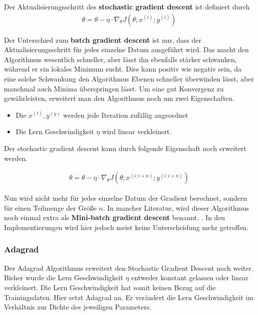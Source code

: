 \begin{definition}
    \cite[Kapitel 2.2]{Ruder.9152016}
    Der Aktualisierungsschritt des \textbf{stochastic gradient descent} ist definiert durch 
    \begin{align}
        \theta = \theta - \eta \cdot \nabla_\theta J(\theta;x^{(i)};y^{(i)})
    \end{align}
\end{definition}

Der Unterschied zum \textbf{batch gradient descent} ist nur, dass der Aktualisierungsschritt
für jedes einzelne Datum ausgeführt wird. Das macht den 
Algorithmus wesentlich schneller, aber lässt ihn ebenfalls 
stärker schwanken, während er ein lokales Minimum sucht. Dies kann
positiv wie negativ sein, da eine solche Schwankung 
den Algorithmus Ebenen schneller überwinden lässt, aber manchmal
auch Minima überspringen lässt. Um eine gut Konvergenz zu gewährleisten,
erweitert man den Algorithmus noch um zwei Eigenschaften.

\begin{itemize}
    \item Die $x^{(i)}, y^{(y)}$ werden jede Iteration zufällig angeordnet
    \item Die Lern Geschwindigkeit $\eta$ wird linear verkleinert. 
\end{itemize}

Der stochastic gradient descent kann durch folgende Eigenschaft noch 
erweitert werden.

\begin{align}
    \theta = \theta - \eta \cdot \nabla_\theta J(\theta;x^{(i:i+n)};y^{(i:i+n)})
\end{align}

Nun wird nicht mehr für jedes einzelne Datum der Gradient berechnet, sondern
für einen Teilmenge der Größe $n$. In mancher Literatur, wird 
dieser Algorithmus noch einmal extra als \textbf{Mini-batch gradient descent} benannt.
\cite[Kapitel 2.3]{Ruder.9152016}. In den Implementierungen wird hier jedoch meist 
keine Unterscheidung mehr getroffen. \cite{chollet2015keras}

\subsubsection{Adagrad}\label{Adagrad}

Der Adagrad Algorithmus erweitert den Stochastic Gradient Descent noch weiter.
Bisher wurde die Lern Geschwindigkeit $\eta$ entweder konstant gelassen oder linear verkleinert.
Die Lern Geschwindigkeit hat somit keinen Bezug auf die Trainingsdaten. Hier setzt Adagrad an.
Er verändert die Lern Geschwindigkeit im Verhältnis zur Dichte des jeweiligen Parameters.

